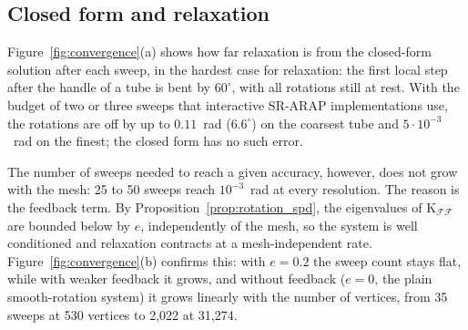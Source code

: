 \documentclass{birkjour}
\theoremstyle{remark}
\numberwithin{equation}{section}
\begin{document}
\subsection{Closed form and relaxation}

Figure~\ref{fig:convergence}(a) shows how far relaxation is from the closed-form solution after each sweep, in the hardest case for relaxation: the first local step after the handle of a tube is bent by $60^\circ$, with all rotations still at rest. With the budget of two or three sweeps that interactive SR-ARAP implementations use, the rotations are off by up to $0.11$~rad ($6.6^\circ$) on the coarsest tube and $5 \cdot 10^{-3}$~rad on the finest; the closed form has no such error.

The number of sweeps needed to reach a given accuracy, however, does not grow with the mesh: 25 to 50 sweeps reach $10^{-3}$~rad at every resolution. The reason is the feedback term. By Proposition~\ref{prop:rotation_spd}, the eigenvalues of $\mathrm K_{\mathcal F \mathcal F}$ are bounded below by $e$, independently of the mesh, so the system is well conditioned and relaxation contracts at a mesh-independent rate. Figure~\ref{fig:convergence}(b) confirms this: with $e = 0.2$ the sweep count stays flat, while with weaker feedback it grows, and without feedback ($e = 0$, the plain smooth-rotation system) it grows linearly with the number of vertices, from 35 sweeps at 530 vertices to 2{,}022 at 31{,}274.
\end{document}
